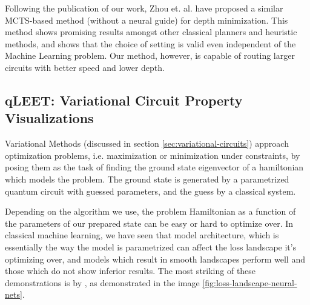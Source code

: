 Following the publication of our work, Zhou et. al. \cite{qroute_mcts} have proposed a similar MCTS-based method (without a neural guide) for depth minimization. This method shows promising results amongst other classical planners and heuristic methods, and shows that the choice of setting is valid even independent of the Machine Learning problem. Our method, however, is capable of routing larger circuits with better speed and lower depth.

\subsection{qLEET: Variational Circuit Property Visualizations}

Variational Methods (discussed in section \ref{sec:variational-circuits}) approach optimization problems, i.e. maximization or minimization under constraints, by posing them as the task of finding the ground state eigenvector of a hamiltonian which models the problem. The ground state is generated by a parametrized quantum circuit with guessed parameters, and the guess by a classical system.

Depending on the algorithm we use, the problem Hamiltonian as a function of the parameters of our prepared state can be easy or hard to optimize over. In classical machine learning, we have seen that model architecture, which is essentially the way the model is parametrized can affect the loss landscape it's optimizing over, and models which result in smooth landscapes perform well and those which do not show inferior results. The most striking of these demonstrations is by \cite{loss-landscapes}, as demonstrated in the image \ref{fig:loss-landscape-neural-nets}. 

